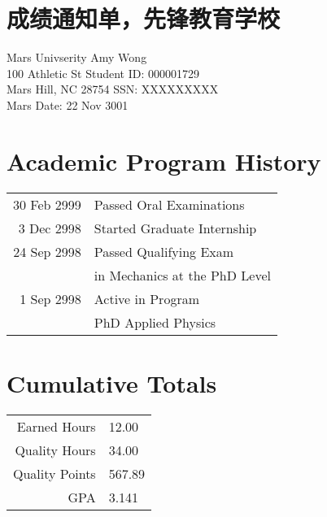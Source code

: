 \documentclass[10pt]{article}
\begin{document}
    \null\section*{\LARGE 成绩通知单，先锋教育学校}

    \vfill

    \begin{center}
        \begin{minipage}[c][40pt][c]{0.67\textwidth}
            Mars Univserity     \hfill Amy Wong              \\
            100 Athletic St     \hfill Student ID: 000001729 \\
            Mars Hill, NC 28754 \hfill SSN: XXXXXXXXX        \\
            Mars                \hfill Date: 22 Nov 3001
        \end{minipage}
    \end{center}

    \vfill

    \section*{Academic Program History}
    \begin{center}
        \begin{minipage}[c][60pt][c]{0.67\textwidth}\centering
        \begin{tabular}{r l}
            30 Feb 2999 & Passed Oral Examinations      \\
            3 Dec 2998 & Started Graduate Internship   \\
            24 Sep 2998 & Passed Qualifying Exam        \\
            & in Mechanics at the PhD Level \\
            1 Sep 2998 & Active in Program             \\
            & PhD Applied Physics
        \end{tabular}
        \end{minipage}
    \end{center}

    \vfill

    \section*{Cumulative Totals}
    \begin{minipage}[c]{1\textwidth}\centering
    \begin{tabular}{r l}
        Earned Hours   & 12.00  \\
        Quality Hours  & 34.00  \\
        Quality Points & 567.89 \\
        GPA            & 3.141  \\
    \end{tabular}
    \end{minipage}
\end{document}
